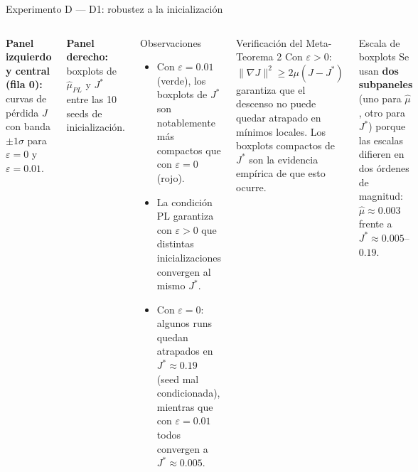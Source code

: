 \documentclass[10pt]{beamer}
\begin{document}
\begin{frame}{Experimento D — D1: robustez a la inicialización}

\begin{columns}
\textbf{Panel izquierdo y central (fila 0):} curvas de pérdida $J$ con banda $\pm 1\sigma$ para $\varepsilon=0$ y $\varepsilon=0.01$.

\medskip
\textbf{Panel derecho:} boxplots de $\hat{\mu}_{PL}$ y $J^*$ entre las 10 seeds de inicialización.

\bigskip
\begin{block}{Observaciones}
\begin{itemize}
  \item Con $\varepsilon=0.01$ (verde), los boxplots de $J^*$ son notablemente más compactos que con $\varepsilon=0$ (rojo).
  \item La condición PL garantiza con $\varepsilon>0$ que distintas inicializaciones convergen al mismo $J^*$.
  \item Con $\varepsilon=0$: algunos runs quedan atrapados en $J^*\approx 0.19$ (seed mal condicionada), mientras que con $\varepsilon=0.01$ todos convergen a $J^*\approx 0.005$.
\end{itemize}
\end{block}

\begin{alertblock}{Verificación del Meta-Teorema 2}
  Con $\varepsilon>0$:
  \[
    \|\nabla J\|^2 \geq 2\mu(J-J^*)
  \]
  garantiza que el descenso no puede quedar atrapado en mínimos locales. Los boxplots compactos de $J^*$ son la evidencia empírica de que esto ocurre.
\end{alertblock}

\medskip
\begin{block}{Escala de boxplots}
  Se usan \textbf{dos subpaneles} (uno para $\hat\mu$, otro para $J^*$) porque las escalas difieren en dos órdenes de magnitud: $\hat\mu\approx 0.003$ frente a $J^*\approx 0.005$--$0.19$.
\end{block}
\end{columns}

\end{frame}
\end{document}
